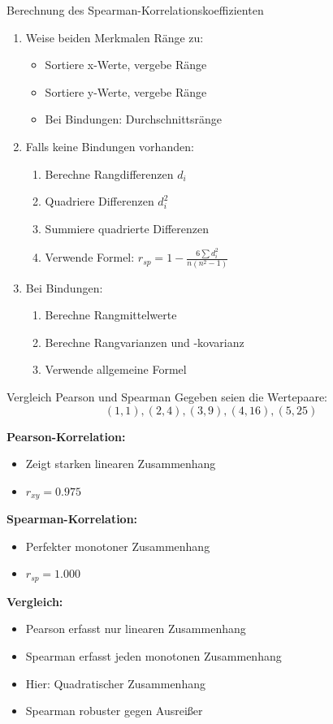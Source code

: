 \begin{KR}{Berechnung des Spearman-Korrelationskoeffizienten}
\begin{enumerate}
    \item Weise beiden Merkmalen Ränge zu:
        \begin{itemize}
            \item Sortiere x-Werte, vergebe Ränge
            \item Sortiere y-Werte, vergebe Ränge
            \item Bei Bindungen: Durchschnittsränge
        \end{itemize}
    \item Falls keine Bindungen vorhanden:
        \begin{enumerate}
            \item Berechne Rangdifferenzen $d_i$
            \item Quadriere Differenzen $d_i^2$
            \item Summiere quadrierte Differenzen
            \item Verwende Formel: $r_{sp} = 1 - \frac{6 \sum d_i^2}{n(n^2-1)}$
        \end{enumerate}
    \item Bei Bindungen:
        \begin{enumerate}
            \item Berechne Rangmittelwerte
            \item Berechne Rangvarianzen und -kovarianz
            \item Verwende allgemeine Formel
        \end{enumerate}
\end{enumerate}
\end{KR}

\begin{example2}{Vergleich Pearson und Spearman}
Gegeben seien die Wertepaare:
$$(1,1), (2,4), (3,9), (4,16), (5,25)$$

\textbf{Pearson-Korrelation:}
\begin{itemize}
    \item Zeigt starken linearen Zusammenhang
    \item $r_{xy} = 0.975$
\end{itemize}

\textbf{Spearman-Korrelation:}
\begin{itemize}
    \item Perfekter monotoner Zusammenhang
    \item $r_{sp} = 1.000$
\end{itemize}

\textbf{Vergleich:}
\begin{itemize}
    \item Pearson erfasst nur linearen Zusammenhang
    \item Spearman erfasst jeden monotonen Zusammenhang
    \item Hier: Quadratischer Zusammenhang
    \item Spearman robuster gegen Ausreißer
\end{itemize}
\end{example2}

